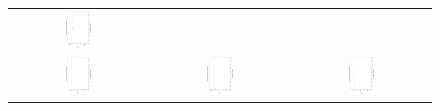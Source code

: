 \begin{figure}[h]
\begin{tabular}{ccc}
   \includegraphics[width=0.2\textwidth,angle=-90,origin=c]{Figures_Chapter7/Results_Chapter3/EPS_DI/2obj_WFG6.eps}
   \\
  \includegraphics[width=0.2\textwidth, angle=-90,origin=c]{Figures_Chapter7/Results_Chapter3/EPS_DI/2obj_WFG7.eps} &
   \includegraphics[width=0.2\textwidth, angle=-90,origin=c]{Figures_Chapter7/Results_Chapter3/EPS_DI/2obj_WFG8.eps} &
   \includegraphics[width=0.2\textwidth,angle=-90,origin=c]{Figures_Chapter7/Results_Chapter3/EPS_DI/2obj_WFG9.eps}
\end{tabular}
\end{figure}

